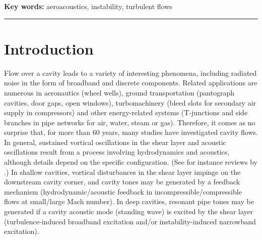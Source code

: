 \documentclass[11pt,onecolumn]{article}
\begin{document}
\bigskip

\noindent 
\textbf{Key words:}
aeroacoustics,
instability,
turbulent flows

\medskip
\hrule

\vspace{1cm}

\section{Introduction}

Flow over a cavity leads to a variety of interesting phenomena, including radiated noise in the form of broadband and discrete components. 
Related applications are numerous in aeronautics (wheel wells), ground transportation (pantograph cavities, door gaps, open windows),
turbomachinery (bleed slots for secondary air supply in compressors) 
and other energy-related systems (T-junctions and side branches in pipe networks for air, water, steam or gas).
Therefore, it comes as no surprise that, for more than 60 years, many studies have investigated cavity flows.
In general, sustained vortical oscillations in the shear layer and acoustic oscillations result from a  process involving hydrodynamics and acoustics, although details depend on the specific configuration.
(See for instance reviews by \cite{Rockwell1978, Rockwell1979, Rockwell1983, Rowley2006, Tonon2011, Morris11}.)
%
In shallow cavities, vortical disturbances in the shear layer impinge on the downstream cavity corner, and cavity tones may be generated by a feedback mechanism (hydrodynamic/acoustic feedback in incompressible/compressible flows at small/large Mach number).
In deep cavities, 
resonant pipe tones may be generated if
 a cavity acoustic mode (standing wave) is excited
by the shear layer (turbulence-induced broadband  excitation and/or instability-induced narrowband excitation).
\end{document}

